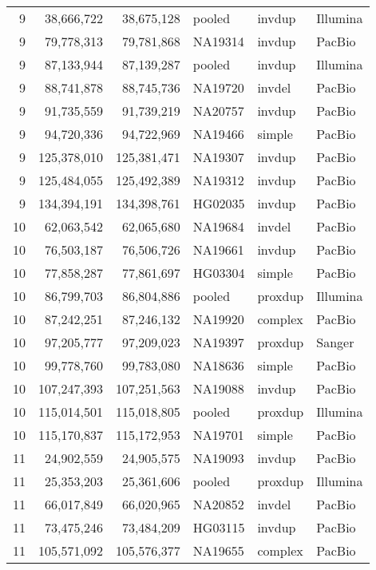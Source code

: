 {\begin{tiny}
\begin{longtable}{rrrlll}
    9   & 38,666,722  & 38,675,128  & pooled  & invdup  & Illumina  \\
    9   & 79,778,313  & 79,781,868  & NA19314 & invdup  & PacBio  \\
    9   & 87,133,944  & 87,139,287  & pooled  & invdup  & Illumina  \\
    9   & 88,741,878  & 88,745,736  & NA19720 & invdel  & PacBio  \\
    9   & 91,735,559  & 91,739,219  & NA20757 & invdup  & PacBio  \\
    9   & 94,720,336  & 94,722,969  & NA19466 & simple  & PacBio  \\
    9   & 125,378,010 & 125,381,471 & NA19307 & invdup  & PacBio  \\
    9   & 125,484,055 & 125,492,389 & NA19312 & invdup  & PacBio  \\
    9   & 134,394,191 & 134,398,761 & HG02035 & invdup  & PacBio  \\
    10  & 62,063,542  & 62,065,680  & NA19684 & invdel  & PacBio  \\
    10  & 76,503,187  & 76,506,726  & NA19661 & invdup  & PacBio  \\
    10  & 77,858,287  & 77,861,697  & HG03304 & simple  & PacBio  \\
    10  & 86,799,703  & 86,804,886  & pooled  & proxdup & Illumina  \\
    10  & 87,242,251  & 87,246,132  & NA19920 & complex & PacBio  \\
    10  & 97,205,777  & 97,209,023  & NA19397 & proxdup & Sanger  \\
    10  & 99,778,760  & 99,783,080  & NA18636 & simple  & PacBio  \\
    10  & 107,247,393 & 107,251,563 & NA19088 & invdup  & PacBio  \\
    10  & 115,014,501 & 115,018,805 & pooled  & proxdup & Illumina  \\
    10  & 115,170,837 & 115,172,953 & NA19701 & simple  & PacBio  \\
    11  & 24,902,559  & 24,905,575  & NA19093 & invdup  & PacBio  \\
    11  & 25,353,203  & 25,361,606  & pooled  & proxdup & Illumina  \\
    11  & 66,017,849  & 66,020,965  & NA20852 & invdel  & PacBio  \\
    11  & 73,475,246  & 73,484,209  & HG03115 & invdup  & PacBio  \\
    11  & 105,571,092 & 105,576,377 & NA19655 & complex & PacBio  \\

\end{longtable}
\end{tiny}}
